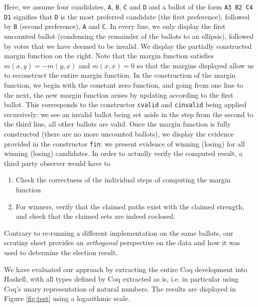 \noindent
Here, we assume four candidates, \texttt{A}, \texttt{B}, \texttt{C}
and \texttt{D} and a ballot of the form \texttt{A3  B2  C4  D1}
signifies that \texttt{D} is the most preferred candidate (the first
preference), followed by \texttt{B} (second preference), \texttt{A}
and \texttt{C}. In every line, we only display the first uncounted
ballot (condensing the remainder of the ballots to an ellipsis),
followed by votes that we have deemed to be invalid. We display the
partially constructed margin function on the right. Note that the
margin function satisfies  $m(x, y) = -m(y, x)$ and $m(x, x) = 0$ so
that the margins displayed allow us to reconstruct the entire margin
function. In the construction of the margin function, we begin with
the constant zero function, and going from one line to the next, the
new margin function arises by updating according to the first
ballot. This corresponds to the constructor \texttt{cvalid} and
\texttt{cinvalid} being
applied recursively: we see an invalid ballot being set aside in the
step from the second to the third line, all other ballots are valid.
Once the margin function is fully constructed (there are no
more uncounted ballots), we display the evidence provided in the
constructor \texttt{fin}: we present evidence of winning (losing) for
all winning (losing) candidates. 
%
In order to actually verify the computed result, a third party
observer would have to
\begin{enumerate}
\item Check the correctness of the individual steps of computing the
margin function
\item For winners, verify that the claimed paths exist with the
claimed strength, and check that the claimed sets are indeed
coclosed.
\end{enumerate}

\noindent
Contrary to re-running a different implementation on the same
ballots, our scrutiny sheet provides an \emph{orthogonal}
perspective on the data and how it was used to determine the
election result.

We have evaluated our approach by extracting the entire Coq
development into Haskell, with all types defined by Coq extracted as
is, i.e. in particular using Coq's unary representation of natural
numbers. The results are displayed in Figure \ref{fig:test}
using a logarithmic scale. 




